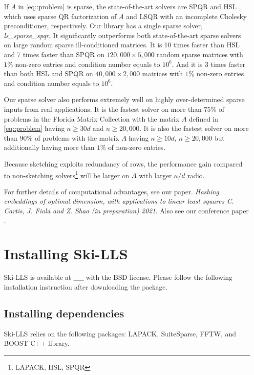 \documentclass[english,11pt]{article}
\begin{document}
If $A$ in \eqref{eq::problem} is sparse, the state-of-the-art solvers are SPQR \cite{Davis:2011ft} and HSL \cite{Scott:2014iq}, which uses sparse QR factorization of $A$ and LSQR with an incomplete Cholesky preconditioner, respectively. Our library has a single sparse solver, {\it ls_sparse_spqr}. It significantly outperforms both state-of-the-art sparse solvers on large random sparse ill-conditioned matrices. It is 10 times faster than HSL and 7 times faster than SPQR on $120,000 \times 5,000$ random sparse matrices with $1\%$ non-zero entries and condition number equals to $10^6$. And it is 3 times faster than both HSL and SPQR on $40,000 \times 2,000$ matrices with $1\%$ non-zero entries and condition number equals to $10^6$.

Our sparse solver also performs extremely well on highly over-determined sparse inputs from real applications. It is the fastest solver on more than $75 \%$ of problems in the Florida Matrix Collection \cite{Davis_2011} with the matrix $A$ defined in \eqref{eq::problem} having $n\geq 30d$ and $n \geq 20,000$. It is also the fastest solver on more than $90\%$ of problems with the matrix $A$ having $n\geq 10d$, $n \geq 20,000$ but additionally having more than $1\%$ of non-zero entries. 

Because sketching exploits redundancy of rows, the performance gain compared to non-sketching solvers\footnote{LAPACK, HSL, SPQR} will be larger on $A$ with larger $n/d$ radio.

For further details of computational advantages, see our paper. {\it{Hashing embeddings of optimal dimension, with applications to linear least squares
C. Cartis, J. Fiala and Z. Shao (in preparation) 2021}}. Also see our conference paper \cite{Zhen:ICML}.

\section{Installing Ski-LLS}
Ski-LLS is available at __ with the BSD license. Please follow the following installation instruction after downloading the package. 
\subsection{Installing dependencies}
Ski-LLS relies on the following packages: LAPACK, SuiteSparse, FFTW, and BOOST C++ library. 
\end{document}
